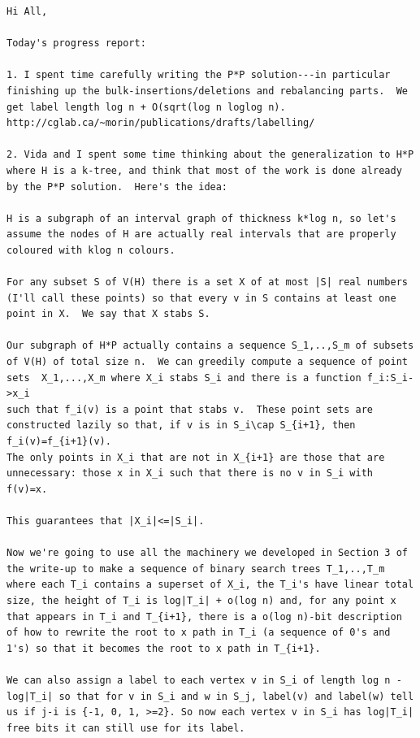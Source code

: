\documentclass[kpfonts]{patmorin}
\begin{document}
  














\newpage


\begin{verbatim}
Hi All,

Today's progress report:

1. I spent time carefully writing the P*P solution---in particular
finishing up the bulk-insertions/deletions and rebalancing parts.  We
get label length log n + O(sqrt(log n loglog n).
http://cglab.ca/~morin/publications/drafts/labelling/

2. Vida and I spent some time thinking about the generalization to H*P
where H is a k-tree, and think that most of the work is done already
by the P*P solution.  Here's the idea:

H is a subgraph of an interval graph of thickness k*log n, so let's
assume the nodes of H are actually real intervals that are properly
coloured with klog n colours.

For any subset S of V(H) there is a set X of at most |S| real numbers
(I'll call these points) so that every v in S contains at least one
point in X.  We say that X stabs S.

Our subgraph of H*P actually contains a sequence S_1,..,S_m of subsets
of V(H) of total size n.  We can greedily compute a sequence of point
sets  X_1,...,X_m where X_i stabs S_i and there is a function f_i:S_i->x_i
such that f_i(v) is a point that stabs v.  These point sets are
constructed lazily so that, if v is in S_i\cap S_{i+1}, then f_i(v)=f_{i+1}(v). 
The only points in X_i that are not in X_{i+1} are those that are unnecessary: those x in X_i such that there is no v in S_i with f(v)=x.

This guarantees that |X_i|<=|S_i|.

Now we're going to use all the machinery we developed in Section 3 of
the write-up to make a sequence of binary search trees T_1,..,T_m
where each T_i contains a superset of X_i, the T_i's have linear total
size, the height of T_i is log|T_i| + o(log n) and, for any point x
that appears in T_i and T_{i+1}, there is a o(log n)-bit description
of how to rewrite the root to x path in T_i (a sequence of 0's and
1's) so that it becomes the root to x path in T_{i+1}.

We can also assign a label to each vertex v in S_i of length log n -
log|T_i| so that for v in S_i and w in S_j, label(v) and label(w) tell
us if j-i is {-1, 0, 1, >=2}. So now each vertex v in S_i has log|T_i|
free bits it can still use for its label.


\end{verbatim}
\end{document}
